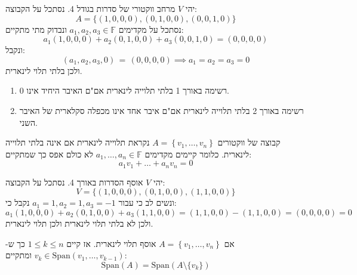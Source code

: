 \documentclass{tstextbook}
\begin{document}
\begin{example}
יהי \(V\) מרחב ווקטורי של סדרות בגודל 4. נסתכל על הקבוצה:
$$A=\{ (1,0,0,0),(0,1,0,0),(0,0,1,0) \}$$
נסתכל על מקדימים \(a_{1},a_{2},a_{3} \in\mathbb{F}\) ונבדוק מתי מתקיים:
$$a_{1}(1,0,0,0)+a_{2}(0,1,0,0)+a_{3}(0,0,1,0)=(0,0,0,0)$$
ונקבל:
$$(a_{1},a_{2},a_{3},0)\,=\,(0,0,0,0)\implies a_{1}=a_{2}=a_{3}=0$$
ולכן בלתי תלוי לינארית.

\end{example}
\begin{proposition}
  \begin{enumerate}
    \item רשימה באורך 1 בלתי תלוייה לינארית אם"ם האיבר היחיד אינו 0. 


    \item רשימה באורך 2 בלתי תלוייה לינארית אם"ם איבר אחד אינו מכפלה סקלארית של האיבר השני. 


  \end{enumerate}
\end{proposition}
\begin{definition}
קבוצה של ווקטורים \(A=\left\{  v_{1},\dots,v_{n}  \right\}\) נקראת תלוייה לינארית אם אינה בלתי תלוייה לינארית. כלומר קיימים מקדימים \(a_{1},\dots,a_{n}\in \mathbb{F}\) לא כולם אפס כך שמתקיים:
$$a_{1}v_{1}+\dots+a_{n}v_{n}=0$$

\end{definition}
\begin{example}
יהי \(V\) אוסף הסדרות באורך 4. נסתכל על הקבוצה:
$$V=\{ (1,0,0,0), (0,1,0,0),(1,1,0,0) \}$$
ונשים לב כי עבור \(a_{1}=1,a_{2}=1,a_{3}=-1\) נקבל כי:
$$a_{1}(1,0,0,0)+a_{2}(0,1,0,0)+a_{3}(1,1,0,0)=(1,1,0,0)-(1,1,0,0)=(0,0,0,0)=0$$
ולכן לא בלתי תלוי לינארית ולכן תלוי לינארית.

\end{example}
\begin{proposition}
אם \(A=\left\{  v_{1},\dots,v_{n}  \right\}\) אוסף תלוי לינארית. אז קיים \(1\leq k\leq n\) כך ש- \(v_{k}\in \mathrm{Span}\left( v_{1},\dots ,v_{k-1} \right)\) ומתקיים:
$$\mathrm{Span}  (A)  =\mathrm{Span}\left( A\setminus \{ v_{k} \} \right)$$

\end{proposition}
\end{document}
